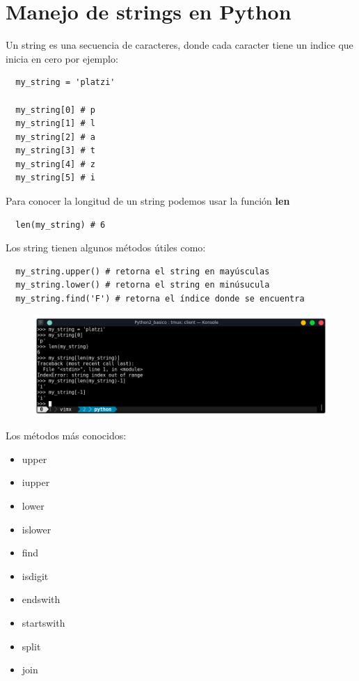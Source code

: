 \documentclass{article}
\begin{document}
\newpage


\section{Manejo de strings en Python}%
Un string es una secuencia de caracteres, donde cada caracter tiene un indice
que inicia en cero por ejemplo:

\begin{verbatim}
  my_string = 'platzi'

  my_string[0] # p
  my_string[1] # l
  my_string[2] # a
  my_string[3] # t
  my_string[4] # z
  my_string[5] # i
\end{verbatim}

Para conocer la longitud de un string podemos usar la función \textbf{len}

\begin{verbatim}
  len(my_string) # 6
\end{verbatim}

Los string tienen algunos métodos útiles como:

\begin{verbatim}
  my_string.upper() # retorna el string en mayúsculas
  my_string.lower() # retorna el string en minúsucula
  my_string.find('F') # retorna el índice donde se encuentra
\end{verbatim}

\begin{figure}[h!]
  \centering
  \includegraphics[scale=0.75]{./Pictures/004_index_string_len.png}
\end{figure}

Los métodos más conocidos:

\begin{itemize}
  \item upper
  \item iupper
  \item lower
  \item islower
  \item find
  \item isdigit
  \item endswith
  \item startswith
  \item split
  \item join
\end{itemize}
\end{document}
